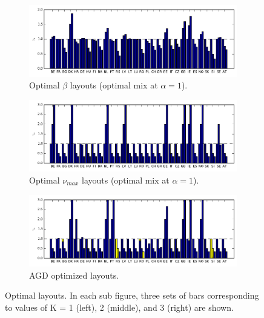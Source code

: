\documentclass[a4paper, 5p, sort&compress]{elsarticle}%
\newcommand{\chromowidth}{1.00 \columnwidth}
\begin{document}

\begin{figure}[p]
  \centering
  \begin{subfigure}{2\columnwidth}
    \includegraphics[width = \chromowidth, center]{betaLayouts}
    \caption{Optimal $\beta$ layouts (optimal mix at $\alpha = 1$).}
    \label{fig:betaOpt}    
  \end{subfigure}
  \begin{subfigure}{2\columnwidth}
    \includegraphics[width = \chromowidth, center]{cfMaxLayouts}
    \caption{Optimal $\nu_{max}$ layouts (optimal mix at $\alpha = 1$).}
    \label{fig:cfMaxOpt}    
  \end{subfigure}
  \begin{subfigure}{2\columnwidth}
    \includegraphics[width = \chromowidth, center]{csLayouts}
    \caption{AGD optimized layouts.}
    \label{fig:agdOpt}    
  \end{subfigure}
  \caption{Optimal layouts. In each sub figure, three sets of bars
    corresponding to values of K = 1 (left), 2 (middle), and 3 (right)
    are shown.}
  \label{fig:optLayouts}
\end{figure}
\end{document}
